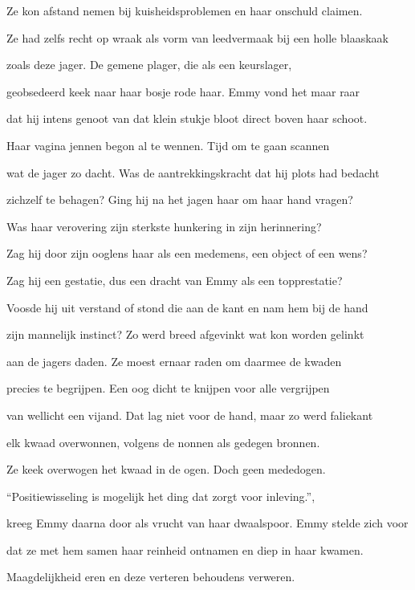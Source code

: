 Ze kon afstand nemen
bij kuisheidsproblemen
en haar onschuld claimen.

Ze had zelfs recht op wraak
als vorm van leedvermaak
bij een holle blaaskaak

zoals deze jager.
De gemene plager,
die als een keurslager,

geobsedeerd keek naar
haar bosje rode haar.
Emmy vond het maar raar

dat hij intens genoot
van dat klein stukje bloot
direct boven haar schoot.

Haar vagina jennen
begon al te wennen.
Tijd om te gaan scannen

wat de jager zo dacht.
Was de aantrekkingskracht
dat hij plots had bedacht

zichzelf te behagen?
Ging hij na het jagen
haar om haar hand vragen?

Was haar verovering
zijn sterkste hunkering
in zijn herinnering?

Zag hij door zijn ooglens
haar als een medemens,
een object of een wens?

Zag hij een gestatie,
dus een dracht van Emmy
als een topprestatie?

Voosde hij uit verstand
of stond die aan de kant
en nam hem bij de hand

zijn mannelijk instinct?
Zo werd breed afgevinkt
wat kon worden gelinkt

aan de jagers daden.
Ze moest ernaar raden
om daarmee de kwaden

precies te begrijpen.
Een oog dicht te knijpen
voor alle vergrijpen

van wellicht een vijand.
Dat lag niet voor de hand,
maar zo werd faliekant

elk kwaad overwonnen,
volgens de nonnen
als gedegen bronnen.

Ze keek overwogen
het kwaad in de ogen.
Doch geen mededogen.

“Positiewisseling
is mogelijk het ding
dat zorgt voor inleving.”,

kreeg Emmy daarna door
als vrucht van haar dwaalspoor.
Emmy stelde zich voor

dat ze met hem samen
haar reinheid ontnamen
en diep in haar kwamen.

Maagdelijkheid eren
en deze verteren
behoudens verweren.

